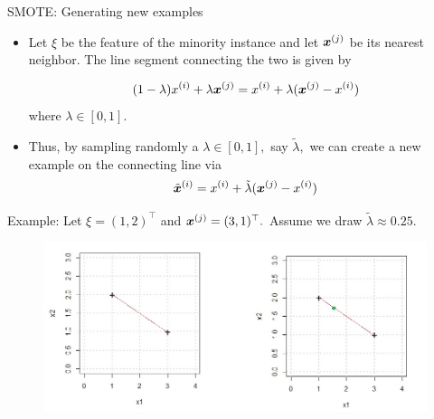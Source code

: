 	\begin{frame}{SMOTE: Generating new examples}
		\footnotesize
		
			\begin{itemize}
				\item Let $\xi$ be the feature of the minority instance and let $\bm{x}^{(j)}$ be its nearest neighbor. The line segment connecting the two is given by
				
				$$		(1-\lambda) x^{(i)} + \lambda\bm{x}^{(j)} = x^{(i)} + \lambda(\bm{x}^{(j)} - x^{(i)})	$$
%				
				where $\lambda \in [0,1].$
				\item Thus, by sampling randomly a $\lambda \in [0,1],$ say $\tilde{\lambda},$ we can create a new example on the connecting line via
%				
				$$   \tilde{\bm{x}}^{(i)} =  x^{(i)} + \tilde{\lambda}(\bm{x}^{(j)} - x^{(i)})	 $$
			\end{itemize}		
				
				Example: Let $\xi = (1,2)^\top$ and $\bm{x}^{(j)} = (3,1)^\top.$ Assume we draw $\tilde{\lambda} \approx 0.25.$
			\begin{figure}
				\centering
				\includegraphics[width=0.8\linewidth]{figure_man/coordinate_system}
			\end{figure}
		
	\end{frame}

